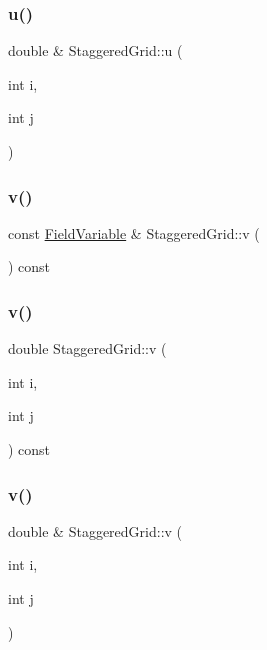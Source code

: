 \subsubsection{\texorpdfstring{u()}{u()}\hspace{0.1cm}{\footnotesize\ttfamily [3/3]}}
{\footnotesize\ttfamily double \& Staggered\+Grid\+::u (\begin{DoxyParamCaption}\item[{int}]{i,  }\item[{int}]{j }\end{DoxyParamCaption})}

\mbox{\label{classStaggeredGrid_a26e478abba632554652c9e05a279d1ca}} 
\subsubsection{\texorpdfstring{v()}{v()}\hspace{0.1cm}{\footnotesize\ttfamily [1/3]}}
{\footnotesize\ttfamily const \mbox{\hyperlink{classFieldVariable}{Field\+Variable}} \& Staggered\+Grid\+::v (\begin{DoxyParamCaption}{ }\end{DoxyParamCaption}) const}

\mbox{\label{classStaggeredGrid_ac052d8803ff950aee04b86ac026c516b}} 
\subsubsection{\texorpdfstring{v()}{v()}\hspace{0.1cm}{\footnotesize\ttfamily [2/3]}}
{\footnotesize\ttfamily double Staggered\+Grid\+::v (\begin{DoxyParamCaption}\item[{int}]{i,  }\item[{int}]{j }\end{DoxyParamCaption}) const}

\mbox{\label{classStaggeredGrid_a7746f703f32c2f20a4c77246eebac697}} 
\subsubsection{\texorpdfstring{v()}{v()}\hspace{0.1cm}{\footnotesize\ttfamily [3/3]}}
{\footnotesize\ttfamily double \& Staggered\+Grid\+::v (\begin{DoxyParamCaption}\item[{int}]{i,  }\item[{int}]{j }\end{DoxyParamCaption})}

